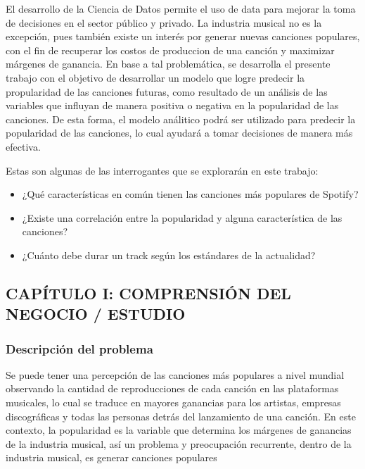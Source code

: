\documentclass[
  letterpaper,
  DIV=11,
  numbers=noendperiod]{scrartcl}
\providecommand{\tightlist}{%
  \setlength{\itemsep}{0pt}\setlength{\parskip}{0pt}}
\begin{document}
El desarrollo de la Ciencia de Datos permite el uso de data para mejorar
la toma de decisiones en el sector público y privado. La industria
musical no es la excepción, pues también existe un interés por generar
nuevas canciones populares, con el fin de recuperar los costos de
produccion de una canción y maximizar márgenes de ganancia. En base a
tal problemática, se desarrolla el presente trabajo con el objetivo de
desarrollar un modelo que logre predecir la propularidad de las
canciones futuras, como resultado de un análisis de las variables que
influyan de manera positiva o negativa en la popularidad de las
canciones. De esta forma, el modelo análitico podrá ser utilizado para
predecir la popularidad de las canciones, lo cual ayudará a tomar
decisiones de manera más efectiva.

Estas son algunas de las interrogantes que se explorarán en este
trabajo:

\begin{itemize}
\tightlist
\item
  ¿Qué características en común tienen las canciones más populares de
  Spotify?
\item
  ¿Existe una correlación entre la popularidad y alguna característica
  de las canciones?
\item
  ¿Cuánto debe durar un track según los estándares de la actualidad?
\end{itemize}

\hypertarget{capuxedtulo-i-comprensiuxf3n-del-negocio-estudio}{%
\subsection{CAPÍTULO I: COMPRENSIÓN DEL NEGOCIO /
ESTUDIO}\label{capuxedtulo-i-comprensiuxf3n-del-negocio-estudio}}

\hypertarget{descripciuxf3n-del-problema}{%
\subsubsection{Descripción del
problema}\label{descripciuxf3n-del-problema}}

Se puede tener una percepción de las canciones más populares a nivel
mundial observando la cantidad de reproducciones de cada canción en las
plataformas musicales, lo cual se traduce en mayores ganancias para los
artistas, empresas discográficas y todas las personas detrás del
lanzamiento de una canción. En este contexto, la popularidad es la
variable que determina los márgenes de ganancias de la industria
musical, así un problema y preocupación recurrente, dentro de la
industria musical, es generar canciones populares
\end{document}
